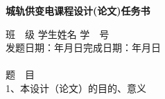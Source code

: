 






\vspace*{0.5cm}
\begin{center}{\hei {} \textbf{城轨供变电课程设计(论文)任务书}}\end{center}
\vspace{1cm}

\hspace{-0.85cm}班\ \ 级\underline{}
学生姓名\underline{}
学\ \ 号\underline{}
\\发题日期：\hspace{2cm}年\hspace{1cm}月\hspace{1cm}日\hfill 完成日期：\hspace{2cm}年\hspace{1cm}月\hspace{1cm}日
\\
\\题\ \ 目\underline{}
\\1、本设计（论文）的目的、意义

